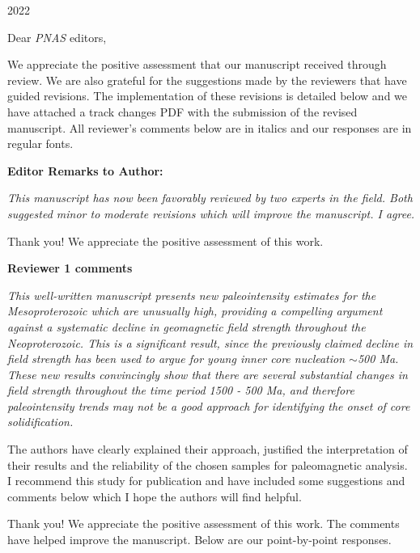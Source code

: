 \documentclass[11pt, letterpaper]{article}
\begin{document}
\begin{flushleft}
 
\hfill 2022

Dear \textit{PNAS} editors,

We appreciate the positive assessment that our manuscript received through review. We are also grateful for the suggestions made by the reviewers that have guided revisions. The implementation of these revisions is detailed below and we have attached a track changes PDF with the submission of the revised manuscript. All reviewer's comments below are in italics and our responses are in regular fonts. 
 
 \textbf{\Large Editor Remarks to Author:}

\textit{This manuscript has now been favorably reviewed by two experts in the field. Both suggested minor to moderate revisions which will improve the manuscript. I agree.}

Thank you! We appreciate the positive assessment of this work.

\textbf{\Large Reviewer 1 comments}

\itshape
This well-written manuscript presents new paleointensity estimates for the Mesoproterozoic which are unusually high, providing a compelling argument against a systematic decline in geomagnetic field strength throughout the Neoproterozoic. This is a significant result, since the previously claimed decline in field strength has been used to argue for young inner core nucleation $\sim$500 Ma. These new results convincingly show that there are several substantial changes in field strength throughout the time period 1500 - 500 Ma, and therefore paleointensity trends may not be a good approach for identifying the onset of core solidification.

The authors have clearly explained their approach, justified the interpretation of their results and the reliability of the chosen samples for paleomagnetic analysis. I recommend this study for publication and have included some suggestions and comments below which I hope the authors will find helpful.

\upshape 

Thank you! We appreciate the positive assessment of this work. The comments have helped improve the manuscript. Below are our point-by-point responses.


\end{flushleft}
\end{document}
